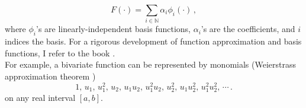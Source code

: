 \begin{equation}
    F(\cdot) = \sum_{i\in \mathbb{N}} {\alpha_i} \phi_i(\cdot)\,,
    \label{eqn: linear param general}
\end{equation}
where $\phi_i$'s are linearly-independent basis functions, $\alpha_i$'s are the coefficients, and $i$
indices the basis. For a rigorous development of function approximation and basis functions,
I refer to the book \cite{real analysis}.\\

For example, a bivariate function can be represented by monomials (Weierstrass approximation 
theorem \cite{functional analysis})
\begin{equation*}
    1,\,  u_1,\, u_1^2,\,
    u_2,\, u_1 u_2,\,  u_1^2 u_2, \,
    u_2^2,\,  u_1 u_2^2,\,  u_1^2 u_2^2,\, \cdots\,.
\end{equation*}
on any real interval $[a,b]$.\\

